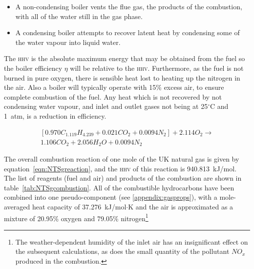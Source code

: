 \documentclass[5p]{elsarticle} %
\begin{document}
\begin{itemize}
    \item A non-condensing boiler vents the flue gas, the products of the combustion, with all of the water still in the gas phase.
    \item A condensing boiler attempts to recover latent heat by condensing some of the water vapour into liquid water. 
\end{itemize}

The \textsc{hhv} is the absolute maximum energy that may be obtained from the fuel so the boiler efficiency $\eta$ will be relative to the \textsc{hhv}\citep{saty2018}.
Furthermore, as the fuel is not burned in pure oxygen, there is sensible heat lost to heating up the nitrogen in the air. 
Also a  boiler will typically operate with 15\% excess air, to ensure complete combustion of the fuel\citep{CleaverBooks2016}.
Any heat which is not recovered by not condensing water vapour, and inlet and outlet gases not being at 25$^\circ$C and 1~atm, is a reduction in efficiency\citep{saty2018}.

\begin{multline}
    \label{eqn:NTSgreaction}
    [0.970 C_{1.119} H_{4.239} + 0.021 C O_2 + 0.0094 N_2] + 2.114 O_2 \longrightarrow \\
    1.106 C O_2 + 2.056 H_2 O + 0.0094 N_2
\end{multline}

The overall combustion reaction of one mole of the UK natural gas is given by equation~\eqref{eqn:NTSgreaction}, and the \textsc{hhv} of this reaction is 940.813~kJ/mol\citep{nist_delta_H}.
The list of reagents (fuel and air) and products of the combustion are shown in table~\ref{tab:NTSgcombustion}.
All of the combustible hydrocarbons have been combined into one pseudo-component\citep{coolprop} (see \ref{appendix:gasprops}), with a mole-averaged heat capacity of 37.276~kJ/mol$\cdot$K\citep{Huber2022} and the air is approximated as a mixture of 20.95\% oxygen and 79.05\% nitrogen\footnote{The weather-dependent humidity of the inlet air has an insignificant effect on the subsequent calculations, as does the small quantity of the pollutant $NO_{x}$ produced in the combustion.}
\end{document}
